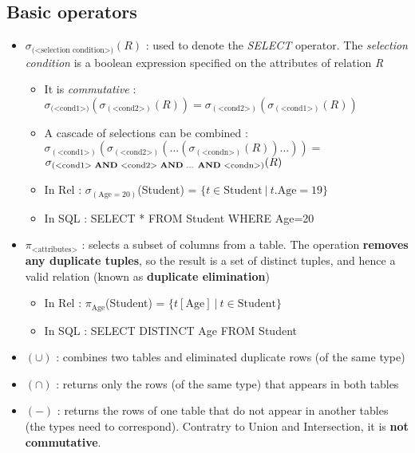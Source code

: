 \subsection{Basic operators}

\begin{itemize}
    \item {} $\sigma_{\text{(<selection condition>)}}(R)$ : used to denote the \textit{SELECT} operator. The \textit{selection condition} is a boolean expression specified on the attributes of relation \textit{R}
        \begin{itemize}
            \item It is \textit{commutative} : $\sigma_{(\text{<cond1>)}}(\sigma_{(\text{<cond2>})}(R)) = \sigma_{(\text{<cond2>})}(\sigma_{(\text{<cond1>})}(R))$
            \item A cascade of selections can be combined : $\sigma_{(\text{<cond1>})}(\sigma_{(\text{<cond2>})}(...(\sigma_{(\text{<condn>})}(R))...)) =$ \\$\sigma_{\text{(<cond1> \textbf{AND} <cond2> \textbf{AND} ... \textbf{AND} <condn>})}(R)$
            \item In Rel : $\sigma_{(\text{Age}=20)}$(Student) = $\{t \in \text{Student} \ | \ t.\text{Age}=19 \}$
            \item In SQL : SELECT * FROM Student WHERE Age=20
        \end{itemize}
    \item {} $\pi_{\text{<attributes>}}$ : selects a subset of columns from a table. The operation \textbf{removes any duplicate tuples}, so the result is a set of distinct tuples, and hence a valid relation (known as \textbf{duplicate elimination})
        \begin{itemize}
            \item In Rel : $\pi_{\text{Age}}$(Student) = $\{ t[\text{Age}] \ | \ t \in \text{Student} \}$
            \item In SQL : SELECT DISTINCT Age FROM Student
        \end{itemize}
    \item {} $(\cup)$ : combines two tables and eliminated duplicate rows (of the same type)
    \item {} $(\cap)$ : returns only the rows (of the same type) that appears in both tables
    \item {} $(-)$ : returns the rows of one table that do not appear in another tables (the types need to correspond). Contratry to Union and Intersection, it is \textbf{not commutative}.

\end{itemize}
